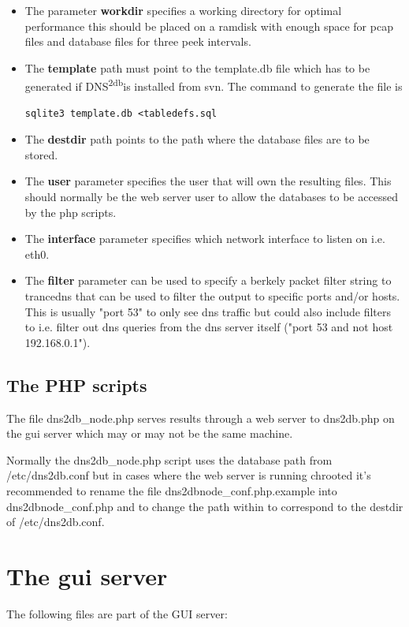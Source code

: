 \documentclass[a4paper]{article}
\newcommand{\dnsdb}{DNS\textsuperscript{2db}\hspace{3pt}}
\begin{document}
\begin{itemize}
\item The parameter \textbf{workdir} specifies a working directory for optimal performance this 
should be placed on a ramdisk with enough space for pcap files and database 
files for three peek intervals.

\item The  \textbf{template} path must point to the template.db file which has to be generated 
if \dnsdb is installed from svn. The command to generate the file is 
\begin{Verbatim}[fontsize=\relsize{-1}]
sqlite3 template.db <tabledefs.sql
\end{Verbatim}

\item The  \textbf{destdir} path points to the path where the database files are to be stored.
\item The  \textbf{user} parameter specifies the user that will own the resulting files. 
This should normally be the web server user to allow the databases to be 
accessed by the php scripts.
\item The  \textbf{interface} parameter specifies which network interface to listen on i.e. eth0.
\item The \textbf{filter} parameter can be used to specify a berkely packet filter 
string to trancedns that can be used to filter the output to specific ports 
and/or hosts. This is usually "port 53" to only see dns traffic but could also 
include filters to i.e. filter out dns queries from the dns server itself ("port 53 and not host 192.168.0.1").
\end{itemize}

\subsection{The PHP scripts}
The file dns2db\_node.php serves results through a web server to dns2db.php 
on the gui server which may or may not be the same machine. 

Normally the dns2db\_node.php script uses the database path 
from /etc/dns2db.conf but in cases where the web server is running chrooted 
it's recommended to rename the file dns2dbnode\_conf.php.example into 
dns2dbnode\_conf.php and to change the path within to correspond to 
the destdir of /etc/dns2db.conf.


\newpage
\section{The gui server}
The following files are part of the GUI server:
\end{document}
